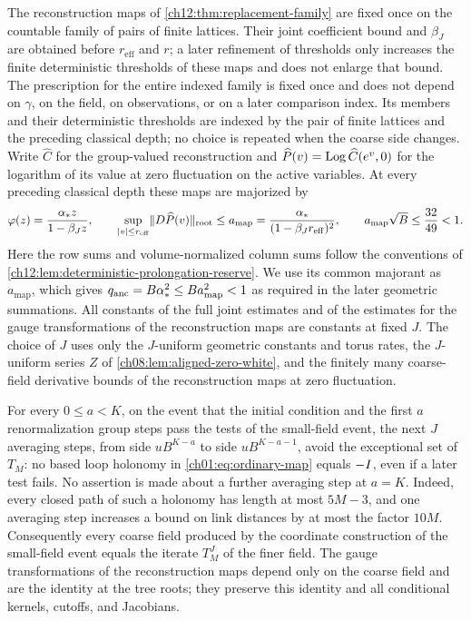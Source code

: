 \begin{theorem}
The reconstruction maps of \cref{ch12:thm:replacement-family} are fixed once on the countable family of pairs of finite lattices. Their joint coefficient bound and $\beta_J$ are obtained before $r_{\mathrm{eff}}$ and $r$; a later refinement of thresholds only increases the finite deterministic thresholds of these maps and does not enlarge that bound. The prescription for the entire indexed family is fixed once and does not depend on $\gamma$, on the field, on observations, or on a later comparison index. Its members and their deterministic thresholds are indexed by the pair of finite lattices and the preceding classical depth; no choice is repeated when the coarse side changes. Write $\widehat C$ for the group-valued reconstruction and $\widehat P(v)=\operatorname{Log}\widehat C(e^v,0)$ for the logarithm of its value at zero fluctuation on the active variables. At every preceding classical depth these maps are majorized by
\begin{equation}\label{ch20:eq:center-majorant}
 \varphi(z)=\frac{\alpha_*z}{1-\beta_Jz},\qquad
 \sup_{\lvert v\rvert\le r_{\mathrm{eff}}}\lVert D\widehat P(v)\rVert_{\mathrm{root}}
 \le a_{\mathrm{map}}=\frac{\alpha_*}{(1-\beta_Jr_{\mathrm{eff}})^2},\qquad
 a_{\mathrm{map}}\sqrt B\le\frac{32}{49}<1.
\end{equation}
Here the row sums and volume-normalized column sums follow the conventions of \cref{ch12:lem:deterministic-prolongation-reserve}. We use its common majorant as $a_{\mathrm{map}}$, which gives $q_{\mathrm{anc}}=B\alpha_*^2\le Ba_{\mathrm{map}}^2<1$ as required in the later geometric summations. All constants of the full joint estimates and of the estimates for the gauge transformations of the reconstruction maps are constants at fixed $J$. The choice of $J$ uses only the $J$-uniform geometric constants and torus rates, the $J$-uniform series $Z$ of \cref{ch08:lem:aligned-zero-white}, and the finitely many coarse-field derivative bounds of the reconstruction maps at zero fluctuation.

For every $0\le a<K$, on the event that the initial condition and the first $a$ renormalization group steps pass the tests of the small-field event, the next $J$ averaging steps, from side $uB^{K-a}$ to side $uB^{K-a-1}$, avoid the exceptional set of $T_M$: no based loop holonomy in \eqref{ch01:eq:ordinary-map} equals $-I$, even if a later test fails. No assertion is made about a further averaging step at $a=K$. Indeed, every closed path of such a holonomy has length at most $5M-3$, and one averaging step increases a bound on link distances by at most the factor $10M$. Consequently every coarse field produced by the coordinate construction of the small-field event equals the iterate $T_M^J$ of the finer field. The gauge transformations of the reconstruction maps depend only on the coarse field and are the identity at the tree roots; they preserve this identity and all conditional kernels, cutoffs, and Jacobians.


\end{theorem}

